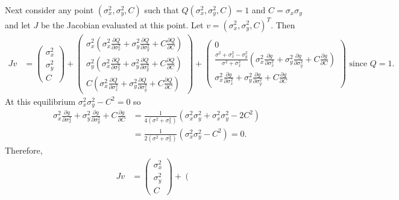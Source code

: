 \documentclass{article}
\begin{document}
\begin{enumerate}
Next consider any point $(\sigma_x^2,\sigma_y^2,C)$ such that $Q(\sigma_x^2,\sigma_y^2,C)=1$ and $C=\sigma_x\sigma_y$ and let $J$ be the Jacobian evaluated at this point. Let $v=(\sigma_x^2,\sigma_y^2,C)^T$. Then
\begin{align*}
Jv&=\left(\begin{array}{c}\sigma_x^2 \\ \sigma_y^2 \\ C \end{array}\right)+
\left(\begin{array}{c}
\sigma_x^2\left(\sigma_x^2\frac{\partial Q}{\partial \sigma_x^2}+\sigma_y^2\frac{\partial Q}{\partial \sigma_y^2}+C\frac{\partial Q}{\partial C}\right) 
\\ \sigma_y^2\left(\sigma_x^2\frac{\partial Q}{\partial \sigma_x^2}+\sigma_y^2\frac{\partial Q}{\partial \sigma_y^2}+C\frac{\partial Q}{\partial C}\right)
\\ C\left(\sigma_x^2\frac{\partial Q}{\partial \sigma_x^2}+\sigma_y^2\frac{\partial Q}{\partial \sigma_y^2}+C\frac{\partial Q}{\partial C}\right) \end{array}\right)
+ \left(\begin{array}{c} 
0 
\\ \frac{\sigma^2+\sigma_x^2-\sigma_y^2}{\sigma^2+\sigma_x^2}\left(\sigma_x^2\frac{\partial g}{\partial \sigma_x^2}+\sigma_y^2\frac{\partial g}{\partial \sigma_y^2}+C\frac{\partial g}{\partial C}\right)
\\ \sigma_x^2\frac{\partial g}{\partial \sigma_x^2}+\sigma_y^2\frac{\partial g}{\partial \sigma_y^2}+C\frac{\partial g}{\partial C}
\end{array}\right) \text{ since $Q=1$}.
\end{align*}
At this equilibrium $\sigma_x^2\sigma_y^2-C^2=0$ so 
\begin{align*}
\sigma_x^2\frac{\partial g}{\partial \sigma_x^2}+\sigma_y^2\frac{\partial g}{\partial \sigma_y^2}+C\frac{\partial g}{\partial C}&=\frac{1}{4(\sigma^2+\sigma_x^2)}(\sigma_x^2\sigma_y^2+\sigma_x^2\sigma_y^2-2C^2)
\\&=\frac{1}{2(\sigma^2+\sigma_x^2)}(\sigma_x^2\sigma_y^2-C^2)=0.
\end{align*}
Therefore,
\begin{align*}
Jv&=\left(\begin{array}{c}\sigma_x^2 \\ \sigma_y^2 \\ C \end{array}\right)+
\left(\begin{array}{c}

\end{array}
\end{align*}
\end{enumerate}
\end{document}
